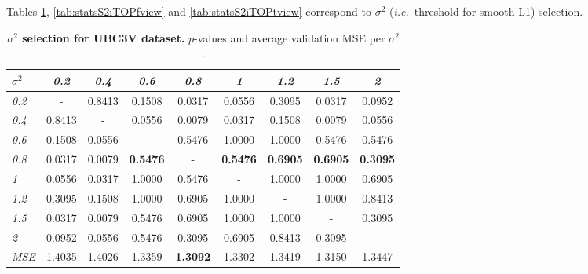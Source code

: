 \documentclass[review,12pt,3p]{elsarticle}
\def \ie{\textit{i.e.}}
\begin{document}
Tables \ref{tab:statsS2UBC3V}, \ref{tab:statsS2iTOPfview} and \ref{tab:statsS2iTOPtview} correspond to $\sigma^2$ (\ie~threshold for smooth-L1) selection.

\begin{table}[t]
\caption{\textbf{$\sigma^2$ selection for UBC3V dataset.} $p$-values and average validation MSE per $\sigma^2$.}
\label{tab:statsS2UBC3V}
\scriptsize %
\begin{center}
\setlength{\tabcolsep}{0.2em} %
\begin{tabular}{|l|c c c c c c c c |}
\hline
 $\sigma^2$ & \emph{0.2} & \emph{0.4}& \emph{0.6}& \emph{0.8}& \emph{1}& \emph{1.2}& \emph{1.5}& \emph{2} \\
  \hline \emph{0.2} & - & 0.8413 & 0.1508 & 0.0317 & 0.0556 & 0.3095 & 0.0317 & 0.0952  \\
  \hline \emph{0.4} & 0.8413 & - & 0.0556 & 0.0079 & 0.0317 & 0.1508 & 0.0079 & 0.0556  \\
  \hline \emph{0.6} & 0.1508 & 0.0556 & - & 0.5476 & 1.0000 & 1.0000 & 0.5476 & 0.5476  \\
  \hline \emph{0.8} & 0.0317 & 0.0079 & \textbf{0.5476} & - & \textbf{0.5476} & \textbf{0.6905} & \textbf{0.6905} & \textbf{0.3095}  \\
  \hline \emph{1} & 0.0556 & 0.0317 & 1.0000 & 0.5476 & - & 1.0000 & 1.0000 & 0.6905  \\
  \hline \emph{1.2} & 0.3095 & 0.1508 & 1.0000 & 0.6905 & 1.0000 & - & 1.0000 & 0.8413  \\
  \hline \emph{1.5} & 0.0317 & 0.0079 & 0.5476 & 0.6905 & 1.0000 & 1.0000 & - & 0.3095  \\
  \hline \emph{2} & 0.0952 & 0.0556 & 0.5476 & 0.3095 & 0.6905 & 0.8413 & 0.3095 & -  \\
\hline 
\hline
\textit{MSE} & 1.4035  &  1.4026  &  1.3359 &    \textbf{1.3092}&    1.3302&    1.3419&    1.3150&    1.3447\\
\hline
\end{tabular} 
\end{center}
\end{table}
\end{document}
